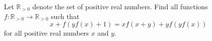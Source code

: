 Let $\mathbb{R}_{>0}$ denote the set of positive real numbers.
Find all functions $f\colon \mathbb{R}_{>0}  \to \mathbb{R}_{>0}$ such that 
$$x + f(yf(x)+1) = xf(x+y) + yf(yf(x))$$
for all positive real numbers $x$ and $y$.

